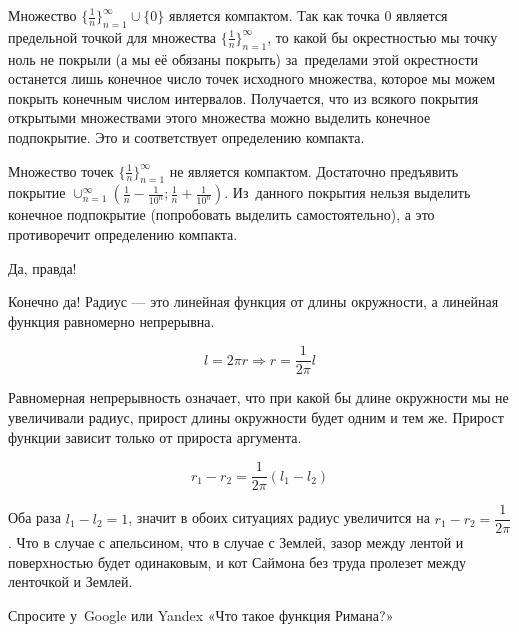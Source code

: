 \begin{solution}{1.10}
Множество $\{\frac{1}{n}\}_{n=1}^{\infty} \cup \{0\}$ является компактом. Так как точка $0$ является предельной точкой для множества  $\{\frac{1}{n}\}_{n=1}^{\infty}$, то какой бы окрестностью мы точку ноль не покрыли (а мы её обязаны покрыть) за~пределами этой окрестности останется лишь конечное число точек исходного множества, которое мы можем покрыть конечным числом интервалов. Получается, что из всякого покрытия открытыми множествами этого множества можно выделить конечное подпокрытие. Это и соответствует определению компакта.

Множество точек  $\{\frac{1}{n}\}_{n=1}^{\infty}$ не является компактом. Достаточно предъявить покрытие $\cup_{n=1}^{\infty} \left(\frac{1}{n} - \frac{1}{10^n}; \frac{1}{n} + \frac{1}{10^n}\right)$.
Из~данного покрытия нельзя выделить конечное подпокрытие (попробовать выделить самостоятельно), а это противоречит определению компакта.
\end{solution}
\begin{solution}{1.11}
Да, правда!
\end{solution}
\begin{solution}{1.12}
Конечно да! Радиус --- это линейная функция от длины окружности, а линейная функция равномерно непрерывна.

\[l = 2 \pi r \Rightarrow r = \frac{1}{2 \pi} l \]

Равномерная непрерывность означает, что при какой бы длине окружности мы не увеличивали радиус, прирост длины окружности будет одним и тем же. Прирост функции зависит только от прироста аргумента.

\[r_1 - r_2 = \frac{1}{2\pi} (l_1 - l_2) \]

Оба раза $l_1 - l_2 = 1$, значит в обоих ситуациях радиус увеличится на $r_1 - r_2 = \dfrac{1}{2\pi}$. Что в случае с апельсином, что в случае с Землей, зазор между лентой и поверхностью будет одинаковым, и кот Саймона без труда пролезет между ленточкой и Землей.
\end{solution}
\begin{solution}{1.13}
\end{solution}
\begin{solution}{1.14}
\end{solution}
\begin{solution}{1.15}
Спросите у~Google или Yandex «Что такое функция Римана?»
\end{solution}
